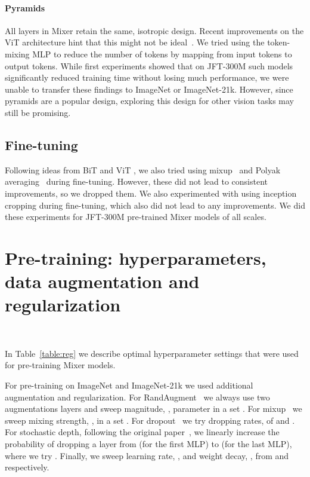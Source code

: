 \documentclass{article}
\newcommand{\name}{Mixer}
\begin{document}
\paragraph{Pyramids}
All layers in \name{} retain the same, isotropic design.
Recent improvements on the ViT architecture hint that this might not be ideal~\citep{wang2021pyramid}.
We tried using the token-mixing MLP to reduce the number of tokens by mapping from  input tokens to  output tokens.
While first experiments showed that on JFT-300M such models significantly reduced training time without losing much performance, we were unable to transfer these findings to ImageNet or ImageNet-21k.
However, since pyramids are a popular design, exploring this design for other vision tasks may still be promising.

\subsection{Fine-tuning}
Following ideas from BiT \cite{kolesnikov2020-bit} and ViT \cite{Dosovitskiy2021}, we also tried using mixup~\cite{zhang2018mixup} and Polyak averaging~\cite{polyak} during fine-tuning. 
However, these did not lead to consistent improvements, so we dropped them. 
We also experimented with using inception cropping \cite{szegedy15inception} during fine-tuning, which also did not lead to any improvements.
We did these experiments for JFT-300M pre-trained \name{} models of all scales.


\section{Pre-training: hyperparameters, data augmentation and regularization}~\label{sec:app:reg}

In Table~\ref{table:reg} we describe 
optimal hyperparameter settings that were used for pre-training \name{} models.

For pre-training on ImageNet and ImageNet-21k we used additional augmentation and regularization.
For RandAugment~\cite{cubuk2020rand} we always use two augmentations layers and sweep magnitude, , parameter in a set . For mixup~\cite{zhang2018mixup} we sweep mixing strength, , in a set . For dropout~\cite{srivastava14dropout} we try dropping rates,  of  and . For stochastic depth, following the original paper~\cite{huang2016deep}, we linearly increase the probability of dropping a layer from  (for the first MLP) to  (for the last MLP), where we try . Finally, we sweep learning rate, , and weight decay, , from  and  respectively. 
\end{document}
